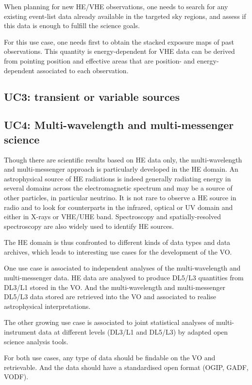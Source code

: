 \documentclass[11pt,a4paper]{ivoa}
\begin{document}
{When planning for new HE/VHE observations, one needs to search for any existing event-list data already available in the
targeted sky regions, and assess if this data is enough to fulfill the science goals.

For this use case, one needs first to obtain the stacked exposure maps of past observations. This quantity is
energy-dependent for VHE data can be derived from pointing position and effective areas that are position- and energy-
dependent associated to each observation.


\subsection{UC3: transient or variable sources}




\subsection{UC4: Multi-wavelength and multi-messenger science}

Though there are scientific results based on HE data only, the multi-wavelength and multi-messenger approach is
particularly developed in the HE domain. An astrophysical source of HE radiations is indeed generally radiating
energy in several domains across the electromagnetic spectrum and may be a source of other particles, in particular
neutrino. It is not rare to observe a HE source in radio and to look for counterparts in the infrared, optical or UV
domain and either in X-rays or VHE/UHE band. Spectroscopy and spatially-resolved spectroscopy are also widely used to
identify HE sources.

The HE domain is thus confronted to different kinds of data types and data archives, which leads to interesting use
cases for the development of the VO.

One use case is associated to independent analyses of the multi-wavelength and multi-messenger data. HE data are
analysed to produce DL5/L3 quantities from DL3/L1 stored in the VO. And the multi-wavelength and multi-messenger
DL5/L3 data stored are retrieved into the VO and associated to realise astrophysical interpretations.

The other growing use case is associated to joint statistical analyses of multi-instrument data at different levels
(DL3/L1 and DL5/L3) by adapted open science analysis tools.

For both use cases, any type of data should be findable on the VO and retrievable. And the data should have a
standardised open format (OGIP, GADF, VODF).

}
\end{document}
